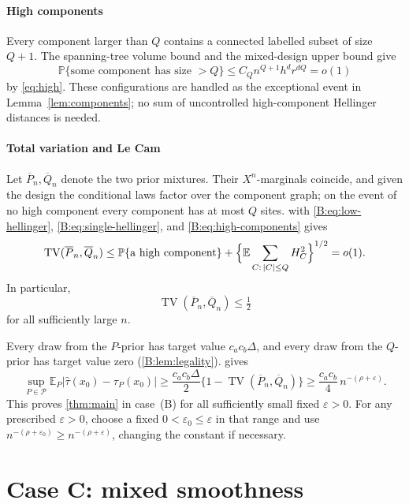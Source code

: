 \documentclass[11pt]{article}
\DeclareMathOperator{\TV}{TV}
\newcommand{\E}{\mathbb{E}}
\newcommand{\PP}{\mathbb{P}}
\newcommand{\cP}{\mathcal{P}}
\newcommand{\abs}[1]{\lvert #1\rvert}
\begin{document}
\subsection{High components}

Every component larger than \(Q\) contains a connected labelled subset of
size \(Q+1\).  The spanning-tree volume bound and the mixed-design upper
bound give
\begin{equation}
 \PP\{\text{some component has size }>Q\}
 \le C_Qn^{Q+1}h^dr^{dQ}=o(1)
 \label{B:eq:high-components}
\end{equation}
by \eqref{eq:high}.  These configurations are handled as the
exceptional event in Lemma~\ref{lem:components}; no sum of uncontrolled
high-component Hellinger distances is needed.

\subsection{Total variation and Le Cam}

Let \(\overline P_n,\overline Q_n\) denote the two prior mixtures.  Their
\(X^n\)-marginals coincide, and given the design the conditional laws
factor over the component graph; on the event of no high component every
component has at most \(Q\) sites.   with
\eqref{B:eq:low-hellinger}, \eqref{B:eq:single-hellinger}, and
\eqref{B:eq:high-components} gives
\[
 \TV(\overline P_n,\overline Q_n)
 \le \PP\{\text{a high component}\}
 +\Bigl\{\E\sum_{C:\,|C|\le Q} H_C^2\Bigr\}^{1/2}
 =o(1).
\]
In particular,
\begin{equation}
 \TV(\overline P_n,\overline Q_n)\le\tfrac12
 \label{B:eq:tv-bound}
\end{equation}
for all sufficiently large \(n\).

Every draw from the \(P\)-prior has target value
\(c_ac_b\Delta\), and every draw from the \(Q\)-prior has target value zero
(\cref{B:lem:legality}).   gives
\[
 \sup_{P\in\cP}\E_P\abs{\widehat\tau(x_0)-\tau_P(x_0)}
 \ge \frac{c_ac_b\Delta}{2}\{1-\TV(\overline P_n,\overline Q_n)\}
 \ge \frac{c_ac_b}{4}\,n^{-(\rho+\varepsilon)}.
\]
This proves \cref{thm:main} in case~(B) for all sufficiently small fixed
\(\varepsilon>0\).  For any prescribed \(\varepsilon>0\), choose a fixed
\(0<\varepsilon_0\le\varepsilon\) in that range and use
\(n^{-(\rho+\varepsilon_0)}\ge n^{-(\rho+\varepsilon)}\), changing the
constant if necessary.


\part{Case C: mixed smoothness}
\end{document}
